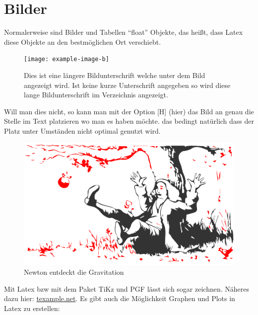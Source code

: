 \section{Bilder}
\label{sec:bilder}
Normalerweise sind Bilder und Tabellen "`float"' Objekte, das heißt, dass Latex diese Objekte an den bestmöglichen Ort verschiebt. 
\begin{figure}[H]
	\centering
	\texttt{[image: example-image-b]} 
	\caption[Dies ist eine kürzere Bildunterschrift (Verzeichnis)]{Dies ist eine längere Bildunterschrift welche unter dem Bild angezeigt wird. Ist keine kurze Unterschrift angegeben so wird diese lange Bildunterschrift im Verzeichnis angezeigt.}
	\label{fig:testbild}
\end{figure}
Will man dies nicht, so kann man mit der Option [H] (hier) das Bild an genau die Stelle im Text platzieren wo man es haben möchte. das bedingt natürlich dass der Platz unter Umständen nicht optimal genutzt wird.
\begin{figure}[H]
	\centering
	\includegraphics[width=0.7\linewidth]{bilder/newton}
	\caption{Newton entdeckt die Gravitation}
	\label{fig:newton}
\end{figure}

Mit Latex bzw mit dem Paket TiKz und PGF lässt sich sogar zeichnen. Näheres dazu hier: \href{http://www.texample.net/tikz/examples/}{texample.net}. Es gibt auch die Möglichkeit Graphen und Plots in Latex zu erstellen:


%
\clearpage